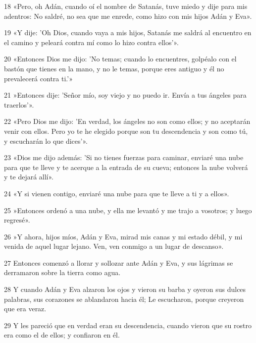 \par 18 «Pero, oh Adán, cuando oí el nombre de Satanás, tuve miedo y dije para mis adentros: No saldré, no sea que me enrede, como hizo con mis hijos Adán y Eva».

\par 19 «Y dije: 'Oh Dios, cuando vaya a mis hijos, Satanás me saldrá al encuentro en el camino y peleará contra mí como lo hizo contra ellos'».

\par 20 «Entonces Dios me dijo: 'No temas; cuando lo encuentres, golpéalo con el bastón que tienes en la mano, y no le temas, porque eres antiguo y él no prevalecerá contra ti.'»

\par 21 »Entonces dije: 'Señor mío, soy viejo y no puedo ir. Envía a tus ángeles para traerlos'».

\par 22 «Pero Dios me dijo: 'En verdad, los ángeles no son como ellos; y no aceptarán venir con ellos. Pero yo te he elegido porque son tu descendencia y son como tú, y escucharán lo que dices'».

\par 23 «Dios me dijo además: 'Si no tienes fuerzas para caminar, enviaré una nube para que te lleve y te acerque a la entrada de su cueva; entonces la nube volverá y te dejará allí».

\par 24 «Y si vienen contigo, enviaré una nube para que te lleve a ti y a ellos».

\par 25 »Entonces ordenó a una nube, y ella me levantó y me trajo a vosotros; y luego regresé».

\par 26 »Y ahora, hijos míos, Adán y Eva, mirad mis canas y mi estado débil, y mi venida de aquel lugar lejano. Ven, ven conmigo a un lugar de descanso».

\par 27 Entonces comenzó a llorar y sollozar ante Adán y Eva, y sus lágrimas se derramaron sobre la tierra como agua.

\par 28 Y cuando Adán y Eva alzaron los ojos y vieron su barba y oyeron sus dulces palabras, sus corazones se ablandaron hacia él; Le escucharon, porque creyeron que era veraz.

\par 29 Y les pareció que en verdad eran su descendencia, cuando vieron que su rostro era como el de ellos; y confiaron en él.

